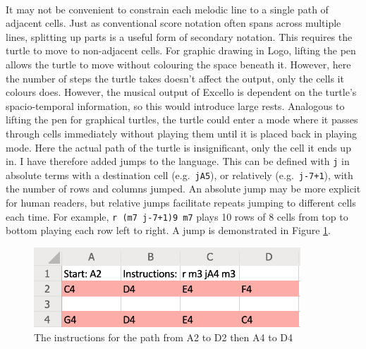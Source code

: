 \paragraph{} It may not be convenient to constrain each melodic line to a single path of adjacent cells. Just as conventional score notation often spans across multiple lines, splitting up parts is a useful form of secondary notation. This requires the turtle to move to non-adjacent cells. For graphic drawing in Logo, lifting the pen allows the turtle to move without colouring the space beneath it. However, here the number of steps the turtle takes doesn't affect the output, only the cells it colours does. However, the musical output of Excello is dependent on the turtle's spacio-temporal information, so this would introduce large rests. Analogous to lifting the pen for graphical turtles, the turtle could enter a mode where it passes through cells immediately without playing them until it is placed back in playing mode. Here the actual path of the turtle is insignificant, only the cell it ends up in. I have therefore added jumps to the language. This can be defined with \texttt{j} in absolute terms with a destination cell (e.g.~\texttt{jA5}), or relatively (e.g.~\texttt{j-7+1}), with the number of rows and columns jumped. An absolute jump may be more explicit for human readers, but relative jumps facilitate repeats jumping to different cells each time. For example, \texttt{r (m7 j-7+1)9 m7} plays 10 rows of 8 cells from top to bottom playing each row left to right. A jump is demonstrated in Figure \ref{prep:language2}.

\begin{figure}[ht]
  \centerline{\includegraphics[width=100mm]{figs/diss2.png}}
\caption{The instructions for the path from A2 to D2 then A4 to D4}
\label{prep:language2}
\end{figure}
\vspace{-20pt}

